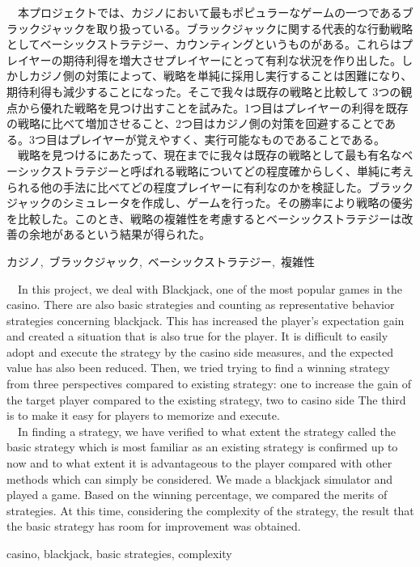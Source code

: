 \documentclass[11pt,a4paper,oneside]{jsbook}
\begin{document}
\maketitle
{}
\fontsize{10}{18}\selectfont
\frontmatter

\begin{jabstract} 
\ \ 本プロジェクトでは、カジノにおいて最もポピュラーなゲームの一つであるブラックジャックを取り扱っている。ブラックジャックに関する代表的な行動戦略としてベーシックストラテジー、カウンティングというものがある。これらはプレイヤーの期待利得を増大させプレイヤーにとって有利な状況を作り出した。しかしカジノ側の対策によって、戦略を単純に採用し実行することは困難になり、期待利得も減少することになった。そこで我々は既存の戦略と比較して 3つの観点から優れた戦略を見つけ出すことを試みた。1つ目はプレイヤーの利得を既存の戦略に比べて増加させること、2つ目はカジノ側の対策を回避することである。3つ目はプレイヤーが覚えやすく、実行可能なものであることである。\\
\ \ 戦略を見つけるにあたって、現在までに我々は既存の戦略として最も有名なベーシックストラテジーと呼ばれる戦略についてどの程度確からしく、単純に考えられる他の手法に比べてどの程度プレイヤーに有利なのかを検証した。ブラックジャックのシミュレータを作成し、ゲームを行った。その勝率により戦略の優劣を比較した。このとき、戦略の複雑性を考慮するとベーシックストラテジーは改善の余地があるという結果が得られた。
\begin{jkeyword}
カジノ,\ ブラックジャック,\ ベーシックストラテジー,\ 複雑性
\end{jkeyword}
\end{jabstract}

\begin{eabstract} 
\ \ In this project, we deal with Blackjack, one of the most popular games in the casino. There are also basic strategies and counting as representative behavior strategies concerning blackjack. This has increased the player's expectation gain and created a situation that is also true for the player. It is difficult to easily adopt and execute the strategy by the casino side measures, and the expected value has also been reduced. Then, we tried trying to find a winning strategy from three perspectives compared to existing strategy: one to increase the gain of the target player compared to the existing strategy, two to casino side The third is to make it easy for players to memorize and execute.\\
\ \ In finding a strategy, we have verified to what extent the strategy called the basic strategy which is most familiar as an existing strategy is confirmed up to now and to what extent it is advantageous to the player compared with other methods which can simply be considered. We made a blackjack simulator and played a game. Based on the winning percentage, we compared the merits of strategies. At this time, considering the complexity of the strategy, the result that the basic strategy has room for improvement was obtained.
\begin{ekeyword}
casino, blackjack, basic strategies, complexity
\end{ekeyword}
\end{eabstract}
\end{document}
